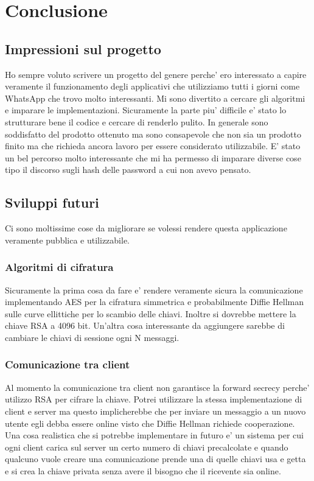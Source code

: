 \chapter{Conclusione}

\section{Impressioni sul progetto}
Ho sempre voluto scrivere un progetto del genere perche' ero interessato a capire veramente il
funzionamento degli applicativi che utilizziamo tutti i giorni come WhatsApp che trovo molto
interessanti. Mi sono divertito a cercare gli algoritmi e imparare le implementazioni. Sicuramente
la parte piu' difficile e' stato lo strutturare bene il codice e cercare di renderlo pulito. In
generale sono soddisfatto del prodotto ottenuto ma sono consapevole che non sia un prodotto finito
ma che richieda ancora lavoro per essere considerato utilizzabile. E' stato un bel percorso molto
interessante che mi ha permesso di imparare diverse cose tipo il discorso sugli hash delle password
a cui non avevo pensato.

\section{Sviluppi futuri}
Ci sono moltissime cose da migliorare se volessi rendere questa applicazione veramente pubblica e
utilizzabile.

\subsection{Algoritmi di cifratura}
Sicuramente la prima cosa da fare e' rendere veramente sicura la comunicazione implementando AES per
la cifratura simmetrica e probabilmente Diffie Hellman sulle curve ellittiche per lo scambio delle
chiavi. Inoltre si dovrebbe mettere la chiave RSA a 4096 bit.
Un'altra cosa interessante da aggiungere sarebbe di cambiare le chiavi di sessione ogni N messaggi.

\subsection{Comunicazione tra client}
Al momento la comunicazione tra client non garantisce la forward secrecy perche' utilizzo RSA per
cifrare la chiave. Potrei utilizzare la stessa implementazione di client e server ma questo
implicherebbe che per inviare un messaggio a un nuovo utente egli debba essere online visto che
Diffie Hellman richiede cooperazione. Una cosa realistica che si potrebbe implementare in futuro e'
un sistema per cui ogni client carica sul server un certo numero di chiavi precalcolate e quando
qualcuno vuole creare una comunicazione prende una di quelle chiavi usa e getta e si crea la chiave
privata senza avere il bisogno che il ricevente sia online.

